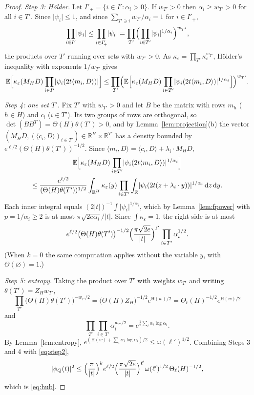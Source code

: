 \documentclass[11pt]{amsart}
\numberwithin{equation}{section}
\theoremstyle{definition}
\theoremstyle{remark}
\newcommand{\R}{\mathbb R}
\newcommand{\E}{\mathbb E}
\newcommand{\1}{\mathbf 1}
\newcommand{\dd}{\,\mathrm d}
\newcommand{\abs}[1]{\lvert #1\rvert}
\begin{document}
\begin{proof}
\emph{Step 3: H\"older.} Let $I'_+=\{i\in I':\alpha_i>0\}$. If $w_{T'}>0$ then $\alpha_i\ge w_{T'}>0$ for all $i\in T'$. Since $\abs{\psi_i}\le1$, and since $\sum_{T'\ni i}w_{T'}/\alpha_i=1$ for $i\in I'_+$,
\[
\prod_{i\in I'}\abs{\psi_i}\le\prod_{i\in I'_+}\abs{\psi_i}=\prod_{T'}\Bigl(\prod_{i\in T'}\abs{\psi_i}^{1/\alpha_i}\Bigr)^{w_{T'}},
\]
the products over $T'$ running over sets with $w_{T'}>0$. As $\kappa_\varepsilon=\prod_{T'}\kappa_\varepsilon^{w_{T'}}$, H\"older's inequality with exponents $1/w_{T'}$ gives
\[
\E\Bigl[\kappa_\varepsilon(M_HD)\prod_{i\in I'}\abs{\psi_i(2t\langle m_i,D\rangle)}\Bigr]\le\prod_{T'}\Bigl(\E\Bigl[\kappa_\varepsilon(M_HD)\prod_{i\in T'}\abs{\psi_i(2t\langle m_i,D\rangle)}^{1/\alpha_i}\Bigr]\Bigr)^{w_{T'}}.
\]

\emph{Step 4: one set $T'$.} Fix $T'$ with $w_{T'}>0$ and let $B$ be the matrix with rows $m_h$ ($h\in H$) and $c_i$ ($i\in T'$). Its two groups of rows are orthogonal, so $\det(BB^T)=\Theta(H)\theta(T')>0$, and by Lemma~\ref{lem:projection}(b) the vector $(M_HD,(\langle c_i,D\rangle)_{i\in T'})\in\R^H\times\R^{T'}$ has a density bounded by $e^{\ell/2}(\Theta(H)\theta(T'))^{-1/2}$. Since $\langle m_i,D\rangle=\langle c_i,D\rangle+\lambda_i\cdot M_HD$,
\begin{multline*}
\E\Bigl[\kappa_\varepsilon(M_HD)\prod_{i\in T'}\abs{\psi_i(2t\langle m_i,D\rangle)}^{1/\alpha_i}\Bigr]\\
\le\frac{e^{\ell/2}}{(\Theta(H)\theta(T'))^{1/2}}\int_{\R^H}\kappa_\varepsilon(y)\prod_{i\in T'}\int_\R\abs{\psi_i(2t(z+\lambda_i\cdot y))}^{1/\alpha_i}\dd z\dd y .
\end{multline*}
Each inner integral equals $(2\abs t)^{-1}\int\abs{\psi_i}^{1/\alpha_i}$, which by Lemma~\ref{lem:fpower} with $p=1/\alpha_i\ge2$ is at most $\pi\sqrt{2e\alpha_i}/\abs t$. Since $\int\kappa_\varepsilon=1$, the right side is at most
\[
e^{\ell/2}\bigl(\Theta(H)\theta(T')\bigr)^{-1/2}\Bigl(\frac{\pi\sqrt{2e}}{\abs t}\Bigr)^{\ell'}\prod_{i\in T'}\alpha_i^{1/2}.
\]
(When $k=0$ the same computation applies without the variable $y$, with $\Theta(\varnothing)=1$.)

\emph{Step 5: entropy.} Taking the product over $T'$ with weights $w_{T'}$ and writing $\theta(T')=Z_Hw_{T'}$,
\[
\prod_{T'}\bigl(\Theta(H)\theta(T')\bigr)^{-w_{T'}/2}=\bigl(\Theta(H)Z_H\bigr)^{-1/2}e^{\mathrm H(w)/2}=\Theta_\ell(H)^{-1/2}e^{\mathrm H(w)/2}
\]
and
\[
\prod_{T'}\prod_{i\in T'}\alpha_i^{w_{T'}/2}=e^{\frac12\sum_i\alpha_i\log\alpha_i}.
\]
By Lemma~\ref{lem:entropy}, $e^{(\mathrm H(w)+\sum_i\alpha_i\log\alpha_i)/2}\le \omega(\ell')^{1/2}$. Combining Steps 3 and 4 with \eqref{eq:step2},
\[
\abs{\phi_Q(t)}^2\le\Bigl(\frac\pi{\abs t}\Bigr)^ke^{\ell/2}\Bigl(\frac{\pi\sqrt{2e}}{\abs t}\Bigr)^{\ell'}\omega(\ell')^{1/2}\,\Theta_\ell(H)^{-1/2},
\]
which is \eqref{eq:hub}.
\end{proof}
\end{document}

